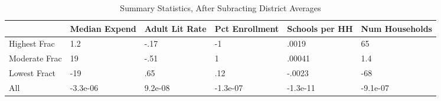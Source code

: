 \begin{table}[htbp]
\caption{\label{vsummarydemeaned} Summary Statistics, After Subracting District Averages}\centering\medskip
\begin{tabular}{|l|l|l|l|l|l|}\hline  
 & Median Expend  & Adult Lit Rate  & Pct Enrollment  & Schools per HH  & Num Households  \\ \hline  
Highest Frac &       1.2 &      -.17 &        -1 &     .0019 &        65 \\ \hline 
Moderate Frac &        19 &      -.51 &         1 &    .00041 &       1.4 \\ \hline 
Lowest Fract &       -19 &       .65 &       .12 &    -.0023 &       -68 \\ \hline 
All &  -3.3e-06 &   9.2e-08 &  -1.3e-07 &  -1.3e-11 &  -9.1e-07 \\ \hline 
  \end{tabular}
\end{table}
